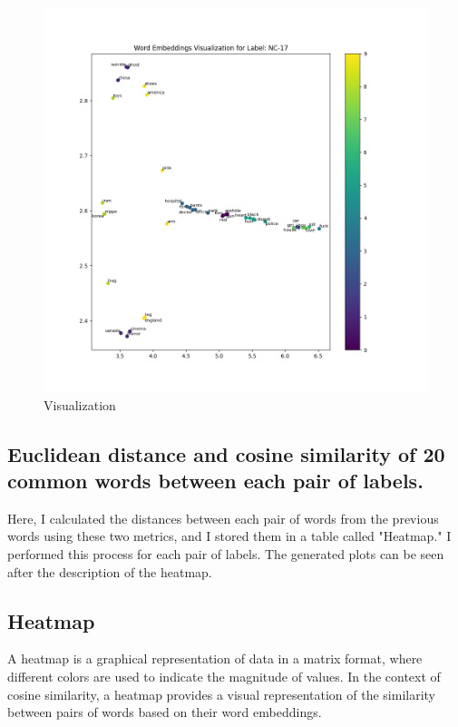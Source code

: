 \documentclass[a4paper]{article}
\begin{document}
\begin{figure}[ht]
    \centering
    \includegraphics[width=1\textwidth]{../stats/word_embeddings_NC-17.png}
    \caption{Visualization}
\end{figure}

\FloatBarrier

\subsection*{Euclidean distance and cosine similarity of 20 common words between each pair of labels.}

Here, I calculated the distances between each pair of words from the previous words using these two metrics, and I stored them in a table called "Heatmap." I performed this process for each pair of labels. The generated plots can be seen after the description of the heatmap.

\subsection*{Heatmap}
A heatmap is a graphical representation of data in a matrix format, where different colors are used to indicate the magnitude of values. In the context of cosine similarity, a heatmap provides a visual representation of the similarity between pairs of words based on their word embeddings.
\end{document}

